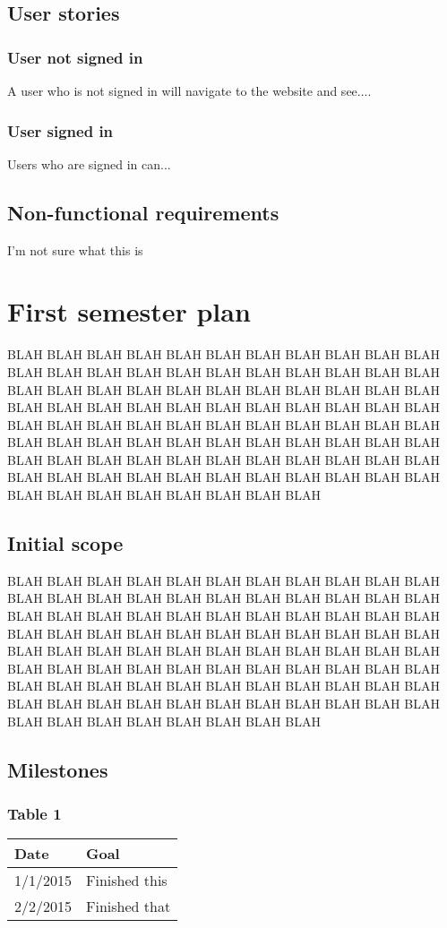 \documentclass[12pt]{article}
\begin{document}
\begin{spacing}{1.5}
\subsection{User stories}
\subsubsection{User not signed in}
A user who is not signed in will navigate to the website and see....
\subsubsection{User signed in}
Users who are signed in can...

\subsection{Non-functional requirements}
I'm not sure what this is 

\newpage

\section{First semester plan}
BLAH BLAH BLAH BLAH BLAH BLAH BLAH BLAH BLAH BLAH BLAH BLAH BLAH BLAH BLAH BLAH BLAH BLAH BLAH BLAH BLAH BLAH BLAH BLAH BLAH BLAH BLAH BLAH BLAH BLAH BLAH BLAH BLAH BLAH BLAH BLAH BLAH BLAH BLAH BLAH BLAH BLAH BLAH BLAH BLAH BLAH BLAH BLAH BLAH BLAH BLAH BLAH BLAH BLAH BLAH BLAH BLAH BLAH BLAH BLAH BLAH BLAH BLAH BLAH BLAH BLAH BLAH BLAH BLAH BLAH BLAH BLAH BLAH BLAH BLAH BLAH BLAH BLAH BLAH BLAH BLAH BLAH BLAH BLAH BLAH BLAH BLAH BLAH BLAH BLAH BLAH BLAH BLAH BLAH BLAH BLAH 

\subsection{Initial scope}
BLAH BLAH BLAH BLAH BLAH BLAH BLAH BLAH BLAH BLAH BLAH BLAH BLAH BLAH BLAH BLAH BLAH BLAH BLAH BLAH BLAH BLAH BLAH BLAH BLAH BLAH BLAH BLAH BLAH BLAH BLAH BLAH BLAH BLAH BLAH BLAH BLAH BLAH BLAH BLAH BLAH BLAH BLAH BLAH BLAH BLAH BLAH BLAH BLAH BLAH BLAH BLAH BLAH BLAH BLAH BLAH BLAH BLAH BLAH BLAH BLAH BLAH BLAH BLAH BLAH BLAH BLAH BLAH BLAH BLAH BLAH BLAH BLAH BLAH BLAH BLAH BLAH BLAH BLAH BLAH BLAH BLAH BLAH BLAH BLAH BLAH BLAH BLAH BLAH BLAH BLAH BLAH BLAH BLAH BLAH BLAH 

\subsection{Milestones}
\subsubsection{Table 1}
\begin{tabular}{l | l}
Date		&	Goal \\
\hline
1/1/2015		&	Finished this \\
\hline
2/2/2015		&	Finished that \\
\end{tabular}

\end{spacing}
\end{document}
